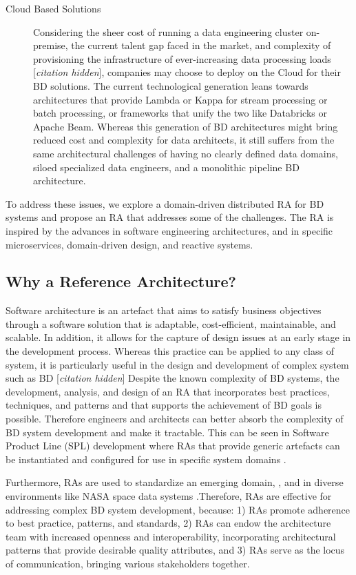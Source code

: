 \documentclass[a4paper,11pt]{article}
\let\cite\citep
\newcommand{\hc}{[\textit{citation hidden}]\textnormal{}}
\begin{document}
\begin{description}
    \item[Cloud Based Solutions] Considering the sheer cost of running a data engineering cluster on-premise, the current talent gap faced in the market, and complexity of provisioning the infrastructure of ever-increasing data processing loads 
    \hc{},
     companies may choose to deploy on the Cloud for their BD solutions. The current technological generation leans towards architectures that provide Lambda or Kappa for stream processing or batch processing, or frameworks that unify the two like Databricks or Apache Beam. Whereas this generation of BD architectures might bring reduced cost and complexity for data architects, it still suffers from the same architectural challenges of having no clearly defined data domains, siloed specialized data engineers, and a monolithic pipeline BD architecture.
\end{description}

To address these issues, we explore a domain-driven distributed RA for BD systems and propose an RA that addresses some of the challenges. The RA is inspired by the advances in software engineering architectures, and in specific microservices, domain-driven design, and reactive systems. 


\subsection{Why a Reference Architecture?}
Software architecture is an artefact that aims to satisfy business objectives through a software solution that is adaptable, cost-efficient, maintainable, and scalable. In addition, it allows for the capture of design issues at an early stage in the development process. Whereas this practice can be applied to any class of system, it is particularly useful in the design and development of complex system such as BD 
\hc{}
 Despite the known complexity of BD systems, the development, analysis, and design of an RA that incorporates best practices, techniques, and patterns and that supports the achievement of BD goals is possible. Therefore engineers and architects can better absorb the complexity of BD system development and make it tractable. This can be seen in Software Product Line (SPL) development where RAs that provide generic artefacts can be instantiated and configured for use in specific system domains \cite{Derras,Cloutier}.


Furthermore, RAs are used to standardize an emerging domain, \citet{Iso18384-1}, and in diverse environments like NASA space data systems \cite{NASA}.Therefore, RAs are effective for addressing complex BD system development, because: 1) RAs promote adherence to best practice, patterns, and standards, 2) RAs can endow the architecture team with increased openness and interoperability, incorporating architectural patterns that provide desirable quality attributes, and 3) RAs serve as the locus of communication, bringing various stakeholders together. 
\end{document}
